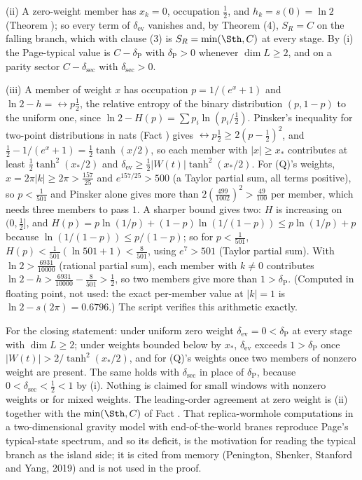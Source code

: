 (ii) A zero-weight member has $x_{k} = 0$, occupation $\tfrac12$, and $h_{k} = s(0) = \ln 2$ (Theorem ); so every term of $\delta_{\mathrm{ev}}$ vanishes and, by Theorem (4), $S_{R} = C$ on the falling branch, which with clause (3) is $S_{R} = \min(\Sth, C)$ at every stage. By (i) the Page-typical value is $C - \delta_{\mathrm{P}}$ with $\delta_{\mathrm{P}} > 0$ whenever $\dim L \ge 2$, and on a parity sector $C - \delta_{\mathrm{sec}}$ with $\delta_{\mathrm{sec}} > 0$.

(iii) A member of weight $x$ has occupation $p = 1/(e^{x} + 1)$ and $\ln 2 - h = \rel{p}{\tfrac12}$, the relative entropy of the binary distribution $(p, 1 - p)$ to the uniform one, since $\ln 2 - H(p) = \sum p_{i}\ln(p_{i}/\tfrac12)$. Pinsker's inequality for two-point distributions in nats (Fact ) gives $\rel{p}{\tfrac12} \ge 2(p - \tfrac12)^{2}$, and $\tfrac12 - 1/(e^{x} + 1) = \tfrac12\tanh(x/2)$, so each member with $|x| \ge x_{*}$ contributes at least $\tfrac12\tanh^{2}(x_{*}/2)$ and $\delta_{\mathrm{ev}} \ge \tfrac12|W(t)|\tanh^{2}(x_{*}/2)$. For (Q)'s weights, $x = 2\pi|k| \ge 2\pi > \tfrac{157}{25}$ and $e^{157/25} > 500$ (a Taylor partial sum, all terms positive), so $p < \tfrac1{501}$ and Pinsker alone gives more than $2(\tfrac{499}{1002})^{2} > \tfrac{49}{100}$ per member, which needs three members to pass $1$. A sharper bound gives two: $H$ is increasing on $(0, \tfrac12]$, and $H(p) = p\ln(1/p) + (1 - p)\ln(1/(1 - p)) \le p\ln(1/p) + p$ because $\ln(1/(1-p)) \le p/(1-p)$; so for $p < \tfrac1{501}$, $H(p) < \tfrac1{501}(\ln 501 + 1) < \tfrac{8}{501}$, using $e^{7} > 501$ (Taylor partial sum). With $\ln 2 > \tfrac{6931}{10000}$ (rational partial sum), each member with $k \neq 0$ contributes $\ln 2 - h > \tfrac{6931}{10000} - \tfrac{8}{501} > \tfrac12$, so two members give more than $1 > \delta_{\mathrm{P}}$. (Computed in floating point, not used: the exact per-member value at $|k| = 1$ is $\ln 2 - s(2\pi) = 0.6796$.) The script verifies this arithmetic exactly.

For the closing statement: under uniform zero weight $\delta_{\mathrm{ev}} = 0 < \delta_{\mathrm{P}}$ at every stage with $\dim L \ge 2$; under weights bounded below by $x_{*}$, $\delta_{\mathrm{ev}}$ exceeds $1 > \delta_{\mathrm{P}}$ once $|W(t)| > 2/\tanh^{2}(x_{*}/2)$, and for (Q)'s weights once two members of nonzero weight are present. The same holds with $\delta_{\mathrm{sec}}$ in place of $\delta_{\mathrm{P}}$, because $0 < \delta_{\mathrm{sec}} < \tfrac12 < 1$ by (i). Nothing is claimed for small windows with nonzero weights or for mixed weights. The leading-order agreement at zero weight is (ii) together with the $\min(\Sth, C)$ of Fact . That replica-wormhole computations in a two-dimensional gravity model with end-of-the-world branes reproduce Page's typical-state spectrum, and so its deficit, is the motivation for reading the typical branch as the island side; it is cited from memory (Penington, Shenker, Stanford and Yang, 2019) and is not used in the proof.
